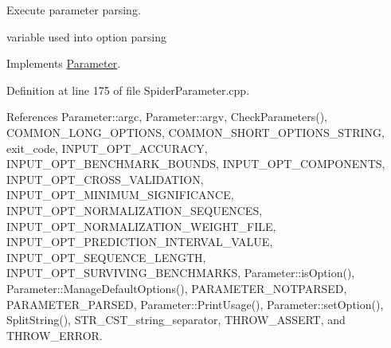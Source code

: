 Execute parameter parsing. 

variable used into option parsing 

Implements \hyperlink{classParameter_a9f5cc51b6e9ac1e01fe1c5a6362c030b}{Parameter}.



Definition at line 175 of file Spider\+Parameter.\+cpp.



References Parameter\+::argc, Parameter\+::argv, Check\+Parameters(), C\+O\+M\+M\+O\+N\+\_\+\+L\+O\+N\+G\+\_\+\+O\+P\+T\+I\+O\+NS, C\+O\+M\+M\+O\+N\+\_\+\+S\+H\+O\+R\+T\+\_\+\+O\+P\+T\+I\+O\+N\+S\+\_\+\+S\+T\+R\+I\+NG, exit\+\_\+code, I\+N\+P\+U\+T\+\_\+\+O\+P\+T\+\_\+\+A\+C\+C\+U\+R\+A\+CY, I\+N\+P\+U\+T\+\_\+\+O\+P\+T\+\_\+\+B\+E\+N\+C\+H\+M\+A\+R\+K\+\_\+\+B\+O\+U\+N\+DS, I\+N\+P\+U\+T\+\_\+\+O\+P\+T\+\_\+\+C\+O\+M\+P\+O\+N\+E\+N\+TS, I\+N\+P\+U\+T\+\_\+\+O\+P\+T\+\_\+\+C\+R\+O\+S\+S\+\_\+\+V\+A\+L\+I\+D\+A\+T\+I\+ON, I\+N\+P\+U\+T\+\_\+\+O\+P\+T\+\_\+\+M\+I\+N\+I\+M\+U\+M\+\_\+\+S\+I\+G\+N\+I\+F\+I\+C\+A\+N\+CE, I\+N\+P\+U\+T\+\_\+\+O\+P\+T\+\_\+\+N\+O\+R\+M\+A\+L\+I\+Z\+A\+T\+I\+O\+N\+\_\+\+S\+E\+Q\+U\+E\+N\+C\+ES, I\+N\+P\+U\+T\+\_\+\+O\+P\+T\+\_\+\+N\+O\+R\+M\+A\+L\+I\+Z\+A\+T\+I\+O\+N\+\_\+\+W\+E\+I\+G\+H\+T\+\_\+\+F\+I\+LE, I\+N\+P\+U\+T\+\_\+\+O\+P\+T\+\_\+\+P\+R\+E\+D\+I\+C\+T\+I\+O\+N\+\_\+\+I\+N\+T\+E\+R\+V\+A\+L\+\_\+\+V\+A\+L\+UE, I\+N\+P\+U\+T\+\_\+\+O\+P\+T\+\_\+\+S\+E\+Q\+U\+E\+N\+C\+E\+\_\+\+L\+E\+N\+G\+TH, I\+N\+P\+U\+T\+\_\+\+O\+P\+T\+\_\+\+S\+U\+R\+V\+I\+V\+I\+N\+G\+\_\+\+B\+E\+N\+C\+H\+M\+A\+R\+KS, Parameter\+::is\+Option(), Parameter\+::\+Manage\+Default\+Options(), P\+A\+R\+A\+M\+E\+T\+E\+R\+\_\+\+N\+O\+T\+P\+A\+R\+S\+ED, P\+A\+R\+A\+M\+E\+T\+E\+R\+\_\+\+P\+A\+R\+S\+ED, Parameter\+::\+Print\+Usage(), Parameter\+::set\+Option(), Split\+String(), S\+T\+R\+\_\+\+C\+S\+T\+\_\+string\+\_\+separator, T\+H\+R\+O\+W\+\_\+\+A\+S\+S\+E\+RT, and T\+H\+R\+O\+W\+\_\+\+E\+R\+R\+OR.

